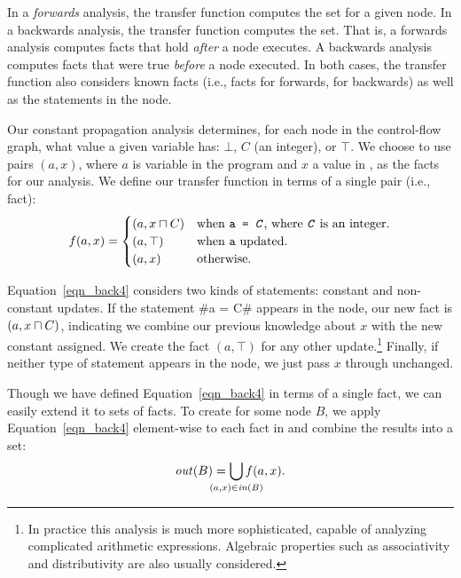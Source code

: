 \documentclass[12pt]{report}
\begin{document}
In a \emph{forwards} analysis, the transfer function computes the \out
set for a given node. In a backwards analysis, the transfer function
computes the \inE set. That is, a forwards analysis computes facts
that hold \emph{after} a node executes. A backwards analysis computes
facts that were true \emph{before} a node executed.  In both cases,
the transfer function also considers known facts (i.e., \inE facts for
forwards, \out for backwards) as well as the statements in the node.

Our constant propagation analysis determines, for each node in the
control-flow graph, what value a given variable has: $\bot$, $C$ (an
integer), or $\top$. We choose to use pairs $(a,x)$, where $a$ is
variable in the program and $x$ a value in \setLC, as the facts for
our analysis. We define our transfer function in terms of a single 
pair (i.e., fact):
\begin{equation}
  f (a,x) = 
  \begin{cases}
    (a,x \lub C) & \text{when \texttt{a = \emph{C}}, where \texttt{\emph{C}} is an integer.} \\
    (a,\top) & \text{when \texttt{a} updated}. \\
    (a,x) & \text{otherwise}. \\
  \end{cases}
  \label{eqn_back4}
\end{equation}

Equation~\eqref{eqn_back4} considers two kinds of statements: constant
and non-constant updates. If the statement #a = C# appears in the
node, our new fact is $(a,x \lub C)$, indicating we combine our
previous knowledge about $x$ with the new constant assigned. We create
the fact $(a,\top)$ for any other update.\footnote{In practice this
  analysis is much more sophisticated, capable of analyzing
  complicated arithmetic expressions. Algebraic properties such as
  associativity and distributivity are also usually considered.}
Finally, if neither type of statement appears in the node, we just
pass $x$ through unchanged.

Though we have defined Equation~\eqref{eqn_back4} in terms of a single
fact, we can easily extend it to sets of facts. To create \outBa for
some node $B$, we apply Equation~\eqref{eqn_back4} element-wise to
each fact in \inBa and combine the results into a set:
\begin{equation}
  \outBa = \bigcup\limits_{\mathclap{(a,x) \in \inBa}} f(a,x).
  \label{eqn_back5}
\end{equation}
\end{document}
